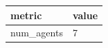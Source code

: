 \begin{tabular}{ll}
\toprule
metric & value \\
\midrule
num\_agents & 7 \\
\bottomrule
\end{tabular}
